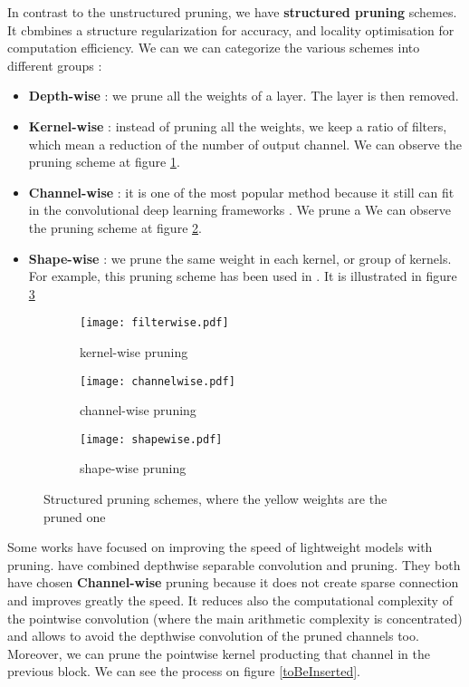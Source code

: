 In contrast to the unstructured pruning, we have \textbf{structured pruning} schemes. It cbmbines a structure regularization for accuracy, and locality optimisation for computation efficiency. We can we can categorize the various schemes into different groups \cite{wen_learning_2016, cheng_recent_2018}:
\begin{itemize}
    \item \textbf{Depth-wise} : we prune all the weights of a layer. The layer is then removed.
    \item \textbf{Kernel-wise} : instead of pruning all the weights, we keep a ratio of filters, which mean a reduction of the number of output channel. We can observe the pruning scheme at figure \ref{fig:struct_pruning:fw}.
    \item \textbf{Channel-wise} : it is one of the most popular method because it still can fit in the convolutional deep learning frameworks \cite{liu_rethinking_2019}. We prune a  We can observe the pruning scheme at figure \ref{fig:struct_pruning:chw}.
    \item \textbf{Shape-wise} : we prune the same weight in each kernel, or group of kernels. For example, this pruning scheme has been used in \textcite{zhu_efficient_2020}. It is illustrated in figure \ref{fig:struct_pruning:sw}
\end{itemize}
%
\begin{figure}
    \centering
    \begin{subfigure}{.32\textwidth}
    \centering
    \texttt{[image: filterwise.pdf]}
    \caption{kernel-wise pruning}
    \label{fig:struct_pruning:fw}
    \end{subfigure}
    \begin{subfigure}{.32\textwidth}
    \centering
    \texttt{[image: channelwise.pdf]}
    \caption{channel-wise pruning}
    \label{fig:struct_pruning:chw}
    \end{subfigure}
    \begin{subfigure}{.32\textwidth}
    \centering
    \texttt{[image: shapewise.pdf]}
    \caption{shape-wise pruning}
    \label{fig:struct_pruning:sw}
    \end{subfigure}
    \caption{Structured pruning schemes, where the yellow weights are the pruned one}
    \label{fig:struct_pruning}
\end{figure}
%
Some works have focused on improving the speed of lightweight models with pruning. \textcite{zhang_channel_2019, tu_pruning_2019} have combined depthwise separable convolution and pruning. They both have chosen \textbf{Channel-wise} pruning because it does not create sparse connection and improves greatly the speed. It reduces also the computational complexity of the pointwise convolution (where the main arithmetic complexity is concentrated) and allows to avoid the depthwise convolution of the pruned channels too. Moreover, we can prune the pointwise kernel producting that channel in the previous block. We can see the process on figure \ref{toBeInserted}. 

